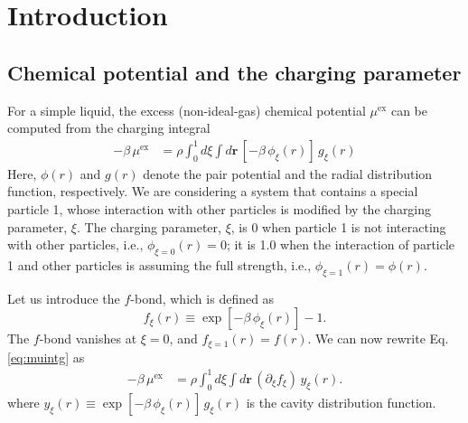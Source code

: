 \documentclass[notitlepage, preprint]{revtex4-1}
\newcommand{\vct}[1]{\mathbf{#1}}
\providecommand{\vr}{} %
\renewcommand{\vr}{\vct{r}}
\newcommand{\supex}[1]{ { { #1 }^{ \mathrm{ex} } } }
\newcommand{\muex}{\supex{\mu}}
\begin{document}

\begin{abstract}
We show that for a general approximate integral equation,
  Attard's formula of chemical potential
  yields a different value from
  the direct charging integral.
%
The difference is due to that the former
  assumes a special charging parameter that is
  proportional to the total correlation function,
%
  and the charging integral depends critically
  on the charging parameter for a general integral equation.
%
Concrete examples are given to illustrate the points.
\end{abstract}

\maketitle

\section{Introduction}



\subsection{Chemical potential and the charging parameter}



For a simple liquid,
the excess (non-ideal-gas) chemical potential $\muex$
can be computed from the charging integral
%
\begin{align}
  -\beta \, \muex
&=
  \rho \int_0^1 d\xi \int d\vr \, [-\beta \, \phi_\xi(r)] \, g_\xi(r)
  \label{eq:muintg}
\end{align}
%
Here,
$\phi(r)$ and $g(r)$ denote the pair potential
and the radial distribution function, respectively.
%
We are considering a system that contains a special particle 1,
whose interaction with other particles
is modified by the charging parameter, $\xi$.
%
The charging parameter, $\xi$, is 0
  when particle 1 is not interacting with other particles,
  i.e., $\phi_{\xi = 0}(r) = 0$;
it is 1.0
  when the interaction of particle 1 and other particles is assuming the full strength,
  i.e., $\phi_{\xi = 1}(r) = \phi(r)$.



Let us introduce the $f$-bond, which is defined as
\[
  f_\xi(r) \equiv \exp[-\beta \, \phi_\xi(r)] - 1.
\]
The $f$-bond vanishes at $\xi = 0$, and $f_{\xi = 1}(r) = f(r)$.
%
We can now rewrite Eq. \eqref{eq:muintg} as
\begin{align}
  -\beta \, \muex
&=
  \rho \int_0^1 d\xi \int d\vr \, (\partial_\xi f_\xi) \, y_\xi(r).
\label{eq:mudf}
\end{align}
%
where $y_\xi(r) \equiv \exp[-\beta \, \phi_\xi(r)] \, g_\xi(r)$
is the cavity distribution function.
\end{document}
